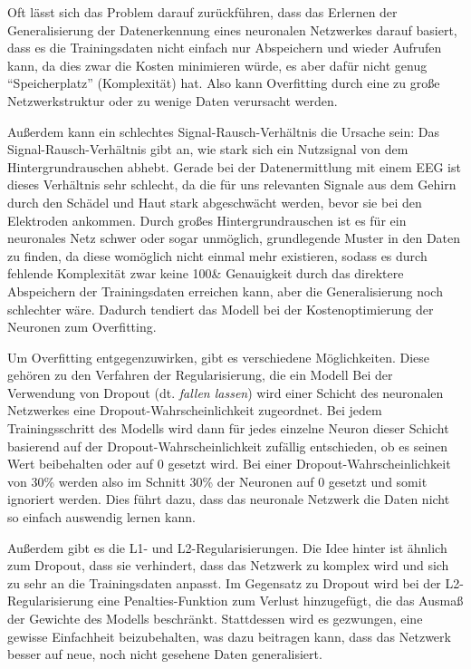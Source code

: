 \documentclass[10pt]{article}
\newcommand{\feng}[1]{{#1}}
\begin{document}
Oft lässt sich das Problem darauf zurückführen, dass das Erlernen der Generalisierung der Datenerkennung eines neuronalen Netzwerkes darauf basiert, dass es die Trainingsdaten nicht einfach nur Abspeichern und wieder Aufrufen kann, da dies zwar die Kosten minimieren würde, es aber dafür nicht genug \enquote{Speicherplatz} (Komplexität) hat. Also kann Overfitting durch eine zu große Netzwerkstruktur oder zu wenige Daten verursacht werden.
 
Außerdem kann ein schlechtes Signal-Rausch-Verhältnis die Ursache sein: Das Signal-Rausch-Verhältnis gibt an, wie stark sich ein Nutzsignal von dem Hintergrundrauschen abhebt. 
Gerade bei der Datenermittlung mit einem EEG ist dieses Verhältnis sehr schlecht, da die für uns relevanten Signale aus dem Gehirn durch den Schädel und Haut stark abgeschwächt werden, bevor sie bei den Elektroden ankommen. 
Durch großes Hintergrundrauschen ist es für ein neuronales Netz schwer oder sogar unmöglich, grundlegende Muster in den Daten zu finden, da diese womöglich nicht einmal mehr existieren, sodass es durch fehlende Komplexität zwar keine 100\& Genauigkeit durch das direktere Abspeichern der Trainingsdaten erreichen kann, aber die Generalisierung noch schlechter wäre. 
Dadurch tendiert das Modell bei der Kostenoptimierung der Neuronen zum Overfitting.

Um Overfitting entgegenzuwirken, gibt es verschiedene Möglichkeiten. Diese gehören zu den Verfahren der Regularisierung, die ein Modell 
Bei der Verwendung von Dropout (dt. \textit{fallen lassen}) wird einer Schicht des neuronalen Netzwerkes eine Dropout-Wahrscheinlichkeit zugeordnet.
Bei jedem Trainingsschritt des Modells wird dann für jedes einzelne Neuron dieser Schicht basierend auf der Dropout-Wahrscheinlichkeit zufällig entschieden, ob es seinen Wert beibehalten oder auf 0 gesetzt wird. 
Bei einer Dropout-Wahrscheinlichkeit von 30\% werden also im Schnitt 30\% der Neuronen auf 0 gesetzt und somit ignoriert werden.  %
Dies führt dazu, dass das neuronale Netzwerk die Daten nicht so einfach auswendig lernen kann. %

Außerdem gibt es die L1- und L2-Regularisierungen.  
Die Idee hinter ist ähnlich zum Dropout, dass sie verhindert, dass das Netzwerk zu komplex wird und sich zu sehr an die Trainingsdaten anpasst.
Im Gegensatz zu \feng{Dropout} wird bei der L2-Regularisierung eine Penalties-Funktion zum Verlust hinzugefügt, die das Ausmaß der Gewichte des Modells beschränkt. Stattdessen wird es gezwungen, eine gewisse Einfachheit beizubehalten, was dazu beitragen kann, dass das Netzwerk besser auf neue, noch nicht gesehene Daten generalisiert.
\end{document}
